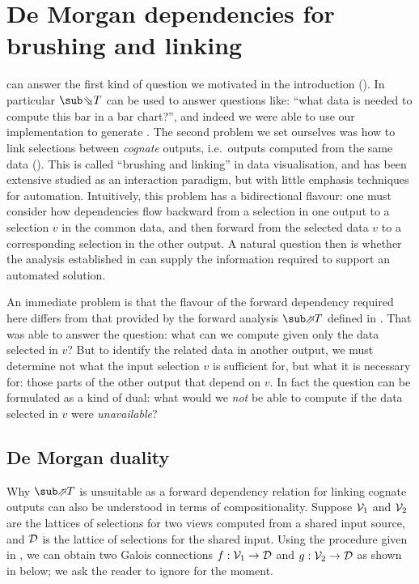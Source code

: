 \newpage
\section{De Morgan dependencies for brushing and linking}
\label{sec:de-morgan}

 can answer the first kind of question we motivated in the introduction (). In particular $\evalBwdF{T}$ can be used to answer questions like: ``what data is needed to compute this bar in a bar chart?'', and indeed we were able to use our implementation to generate . The second problem we set ourselves was how to link selections between \emph{cognate} outputs, i.e.~outputs computed from the same data (). This is called ``brushing and linking'' \cite{becker87} in data visualisation, and has been extensive studied as an interaction paradigm, but with little emphasis techniques for automation. Intuitively, this problem has a bidirectional flavour: one must consider how dependencies flow backward from a selection in one output to a selection $v$ in the common data, and then forward from the selected data $v$ to a corresponding selection in the other output. A natural question then is whether the analysis established in  can supply the information required to support an automated solution.

An immediate problem is that the flavour of the forward dependency required here differs from that provided by the forward analysis $\evalFwdF{T}$ defined in . That was able to answer the question: what can we compute given only the data selected in $v$? But to identify the related data in another output, we must determine not what the input selection $v$ is sufficient for, but what it is necessary for: those parts of the other output that depend on $v$. In fact the question can be formulated as a kind of dual: what would we \emph{not} be able to compute if the data selected in $v$ were \emph{unavailable}?

\subsection{De Morgan duality}
\label{sec:de-morgan:de-morgan-duality}

Why $\evalFwdF{T}$ is unsuitable as a forward dependency relation for linking cognate outputs can also be understood in terms of compositionality. Suppose $\mathcal{V}_1$ and $\mathcal{V}_2$ are the lattices of selections for two views computed from a shared input source, and $\mathcal{D}$ is the lattice of selections for the shared input. Using the procedure given in , we can obtain two Galois connections $f: \mathcal{V}_1 \to \mathcal{D}$ and $g: \mathcal{V}_2 \to \mathcal{D}$ as shown in  below; we ask the reader to ignore  for the moment.

